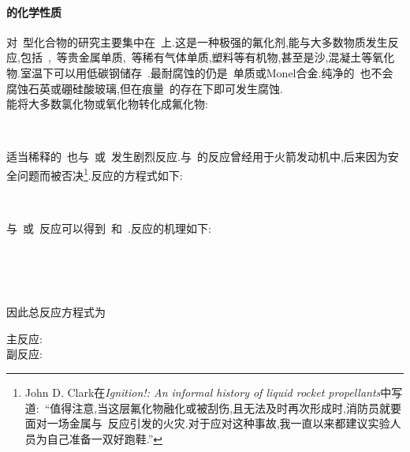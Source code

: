 \documentclass{ctexbook}
\begin{document}
\paragraph{的化学性质}
对~型化合物的研究主要集中在~上.这是一种极强的氟化剂,能与大多数物质发生反应,包括~,~等贵金属单质,~等稀有气体单质,塑料等有机物,甚至是沙,混凝土等氧化物.室温下可以用低碳钢储存~.最耐腐蚀的仍是~单质或Monel合金.纯净的~也不会腐蚀石英或硼硅酸玻璃,但在痕量~的存在下即可发生腐蚀.\\
\indent {}能将大多数氯化物或氧化物转化成氟化物:
\begin{tightcenter}
    \\
\end{tightcenter}
\indent 适当稀释的~也与~或~发生剧烈反应.与~的反应曾经用于火箭发动机中,后来因为安全问题而被否决\footnote{John D. Clark在\textit{Ignition!: An informal history of liquid rocket propellants}中写道:~``值得注意,当这层氟化物融化或被刮伤,且无法及时再次形成时,消防员就要面对一场金属与~反应引发的火灾.对于应对这种事故,我一直以来都建议实验人员为自己准备一双好跑鞋.''\cite{Clark1972}}.反应的方程式如下:
\begin{tightcenter}
    \\
\end{tightcenter}
\indent {}与~或~反应可以得到~和~.反应的机理如下\cite{Miyazaki2018}:
\begin{tightcenter}
    \\
    \\
    \\
\end{tightcenter}
因此总反应方程式为
\begin{tightcenter}
    主反应:~\\
    副反应:~
\end{tightcenter}
\end{document}
